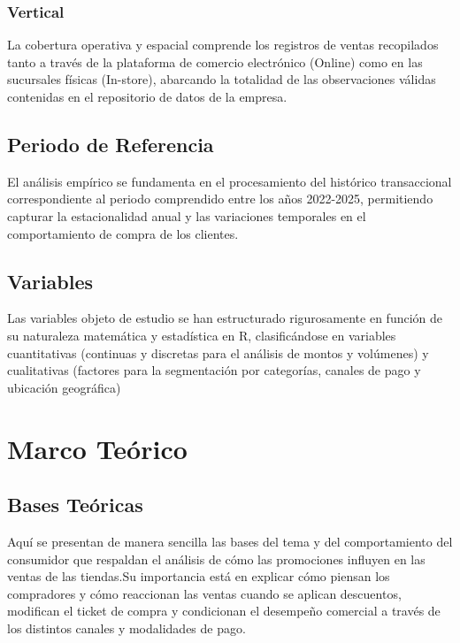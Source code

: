 \documentclass[oneside,11pt]{Latex/Classes/PhDthesisPSnPDF}
\begin{document}
\subsection{Vertical}

La cobertura operativa y espacial comprende los registros de ventas
recopilados tanto a través de la plataforma de comercio electrónico
(Online) como en las sucursales físicas (In-store), abarcando la
totalidad de las observaciones válidas contenidas en el repositorio de
datos de la empresa.

\section{Periodo de Referencia}

El análisis empírico se fundamenta en el procesamiento del histórico
transaccional correspondiente al periodo comprendido entre los años
2022-2025, permitiendo capturar la estacionalidad anual y las
variaciones temporales en el comportamiento de compra de los clientes.

\section{Variables}

Las variables objeto de estudio se han estructurado rigurosamente en
función de su naturaleza matemática y estadística en R, clasificándose
en variables cuantitativas (continuas y discretas para el análisis de
montos y volúmenes) y cualitativas (factores para la segmentación por
categorías, canales de pago y ubicación geográfica)

\chapter{Marco Teórico}

\section{Bases Teóricas}

Aquí se presentan de manera sencilla las bases del tema y del
comportamiento del consumidor que respaldan el análisis de cómo las
promociones influyen en las ventas de las tiendas.Su importancia está en
explicar cómo piensan los compradores y cómo reaccionan las ventas
cuando se aplican descuentos, modifican el ticket de compra y
condicionan el desempeño comercial a través de los distintos canales y
modalidades de pago.\\
\end{document}
